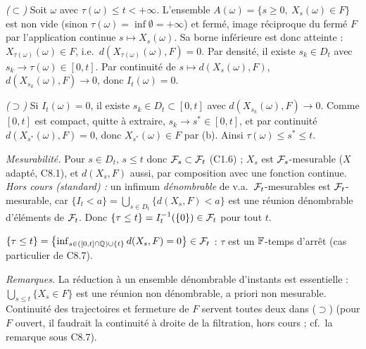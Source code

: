 \documentclass[11pt,a4paper]{article}
\begin{document}
\begin{exo}
\emph{($\subset$)} Soit $\omega$ avec $\tau(\omega)\le t<+\infty$. L'ensemble $A(\omega)=\{s\ge0,\ X_s(\omega)\in F\}$ est non vide (sinon
$\tau(\omega)=\inf\emptyset=+\infty$) et fermé, image réciproque du fermé $F$ par l'application continue $s\mapsto X_s(\omega)$. Sa
borne inférieure est donc atteinte : $X_{\tau(\omega)}(\omega)\in F$, i.e.\ $d(X_{\tau(\omega)}(\omega),F)=0$. Par densité, il existe
$s_k\in D_t$ avec $s_k\to\tau(\omega)\in[0,t]$. Par continuité de $s\mapsto d(X_s(\omega),F)$, $d(X_{s_k}(\omega),F)\to0$, donc $I_t(\omega)=0$.

\emph{($\supset$)} Si $I_t(\omega)=0$, il existe $s_k\in D_t\subset[0,t]$ avec $d(X_{s_k}(\omega),F)\to0$. Comme $[0,t]$ est compact, quitte à extraire,
$s_k\to s^*\in[0,t]$, et par continuité $d(X_{s^*}(\omega),F)=0$, donc $X_{s^*}(\omega)\in F$ par (b). Ainsi $\tau(\omega)\le s^*\le t$.

\emph{Mesurabilité.} Pour $s\in D_t$, $s\le t$ donc $\mathcal{F}_s\subset\mathcal{F}_t$ (C1.6) ; $X_s$ est $\mathcal{F}_s$-mesurable ($X$ adapté, C8.1), et $d(X_s,F)$ aussi,
par composition avec une fonction continue. \emph{Hors cours (standard) :} un infimum \emph{dénombrable} de v.a.\ $\mathcal{F}_t$-mesurables est
$\mathcal{F}_t$-mesurable, car $\{I_t<a\}=\bigcup_{s\in D_t}\{d(X_s,F)<a\}$ est une réunion dénombrable d'éléments de $\mathcal{F}_t$. Donc
$\{\tau\le t\}=I_t^{-1}(\{0\})\in\mathcal{F}_t$ pour tout $t$.
\begin{resultat}$\{\tau\le t\}=\bigl\{\inf_{s\in([0,t]\cap\mathbb{Q})\cup\{t\}}d(X_s,F)=0\bigr\}\in\mathcal{F}_t$ : $\tau$ est un $\mathbb{F}$-temps d'arrêt
(cas particulier de C8.7).\end{resultat}
\textit{Remarques.} La réduction à un ensemble dénombrable d'instants est essentielle : $\bigcup_{s\le t}\{X_s\in F\}$ est une réunion non
dénombrable, a priori non mesurable. Continuité des trajectoires et fermeture de $F$ servent toutes deux dans ($\supset$) (pour $F$ ouvert, il
faudrait la continuité à droite de la filtration, hors cours ; cf.\ la remarque sous C8.7).
\end{exo}
\end{document}
